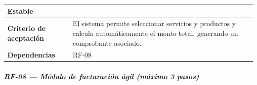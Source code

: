 \documentclass[
]{article}
\begin{document}
{\begin{longtable}[]{|
  >{\raggedright\arraybackslash}p{}|
  >{\raggedright\arraybackslash}p{}|}
\begin{minipage}[t]{\linewidth}
Estable
\end{minipage} \\
\hline
\textbf{Criterio de aceptación} &
\begin{minipage}[t]{\linewidth}\raggedright
El sistema permite seleccionar servicios y productos y calcula automáticamente el monto total, generando un comprobante asociado.
\end{minipage} \\
\hline
\textbf{Dependencias} & \begin{minipage}[t]{\linewidth}\raggedright
RF-08
\end{minipage} \\
\hline
\end{longtable}
}

\subparagraph{RF-08 --- Módulo de facturación ágil (máximo 3 pasos)}\label{rf-08-m-dulo-de-facturaci-n-gil-m-ximo-3-pasos}
\end{document}
